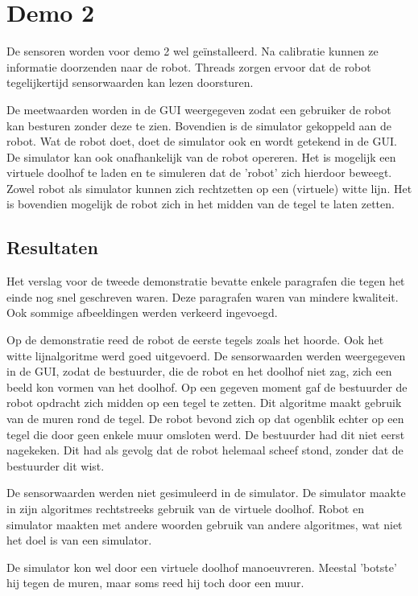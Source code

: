 \documentclass[tt3]{penoverslag}
\begin{document}
\section{Demo 2} %
\label{Asec:demo2}
De sensoren worden voor demo 2 wel ge\"installeerd. Na calibratie kunnen ze informatie doorzenden naar de robot. Threads zorgen ervoor dat de robot tegelijkertijd sensorwaarden kan lezen doorsturen.

De meetwaarden worden in de GUI weergegeven zodat een gebruiker de robot kan besturen zonder deze te zien. Bovendien is de simulator gekoppeld aan de robot. Wat de robot doet, doet de simulator ook en wordt getekend in de GUI. De simulator kan ook onafhankelijk van de robot opereren. Het is mogelijk een virtuele doolhof te laden en te simuleren dat de 'robot' zich hierdoor beweegt. Zowel robot als simulator kunnen zich rechtzetten op een (virtuele) witte lijn. Het is bovendien mogelijk de robot zich in het midden van de tegel te laten zetten.

\subsection{Resultaten} %
\label{Assec:result2}
Het verslag voor de tweede demonstratie bevatte enkele paragrafen die tegen het einde nog snel geschreven waren. Deze paragrafen waren van mindere kwaliteit. Ook sommige afbeeldingen werden verkeerd ingevoegd.

Op de demonstratie reed de robot de eerste tegels zoals het hoorde. Ook het witte lijnalgoritme werd goed uitgevoerd. De sensorwaarden werden weergegeven in de GUI, zodat de bestuurder, die de robot en het doolhof niet zag, zich een beeld kon vormen van het doolhof. Op een gegeven moment gaf de bestuurder de robot opdracht zich midden op een tegel te zetten. Dit algoritme maakt gebruik van de muren rond de tegel. De robot bevond zich op dat ogenblik echter op een tegel die door geen enkele muur omsloten werd. De bestuurder had dit niet eerst nagekeken. Dit had als gevolg dat de robot helemaal scheef stond, zonder dat de bestuurder dit wist.

De sensorwaarden werden niet gesimuleerd in de simulator. De simulator maakte in zijn algoritmes rechtstreeks gebruik van de virtuele doolhof. Robot en simulator maakten met andere woorden gebruik van andere algoritmes, wat niet het doel is van een simulator.

De simulator kon wel door een virtuele doolhof manoeuvreren. Meestal 'botste' hij tegen de muren, maar soms reed hij toch door een muur.
\end{document}
